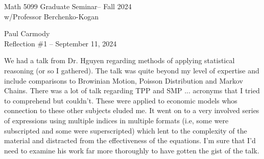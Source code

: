 \documentclass[10pt,a4paper]{report}
\newcommand{\CLASSNAME}{Math 5099 Graduate Seminar}
\newcommand{\STUDENTNAME}{Paul Carmody}
\newcommand{\ASSIGNMENT}{Reflection \#1 }
\newcommand{\DUEDATE}{September 11, 2024}
\newcommand{\SEMESTER}{Fall 2024}
\begin{document}
\begin{center}
	\Large{\CLASSNAME -- \SEMESTER} \\
	\large{ w/Professor Berchenko-Kogan}
\end{center}
\begin{center}
	\STUDENTNAME \\
	\ASSIGNMENT -- \DUEDATE\\
\end{center} 

We had a talk from Dr. Hguyen regarding methods of applying statistical reasoning (or so I gathered).  The talk was quite beyond my level of expertise and include comparisons to Browinian Motion, Poisson Distribution and Markov Chains.  There was a lot of talk regarding TPP and SMP ... acronyms that I tried to comprehend but couldn't.  These were applied to economic models whos connection to these other subjects eluded me.  It went on to a very involved series of expressions using multiple indices in multiple formats (i.e, some were subscripted and some were superscripted) which lent to the complexity of the material and distracted from the effectiveness of the equations.  I'm sure that I'd need to examine his work far more thoroughly to have gotten the gist of the talk.
\end{document}
